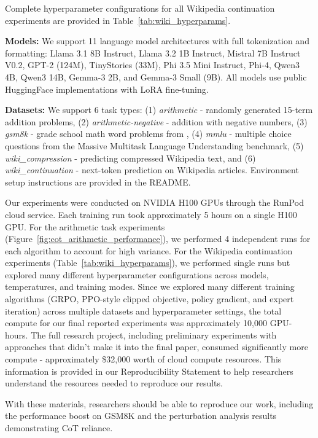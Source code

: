 \documentclass{article} %
\begin{document}
Complete hyperparameter configurations for all Wikipedia continuation experiments are provided in Table~\ref{tab:wiki_hyperparams}.

\textbf{Models:} We support 11 language model architectures with full tokenization and formatting: Llama 3.1 8B Instruct, Llama 3.2 1B Instruct, Mistral 7B Instruct V0.2, GPT-2 (124M), TinyStories (33M), Phi 3.5 Mini Instruct, Phi-4, Qwen3 4B, Qwen3 14B, Gemma-3 2B, and Gemma-3 Small (9B). All models use public HuggingFace implementations with LoRA fine-tuning.

\textbf{Datasets:} We support 6 task types: (1) \textit{arithmetic} - randomly generated 15-term addition problems, (2) \textit{arithmetic-negative} - addition with negative numbers, (3) \textit{gsm8k} - grade school math word problems from \citet{cobbe2021gsm8k}, (4) \textit{mmlu} - multiple choice questions from the Massive Multitask Language Understanding benchmark, (5) \textit{wiki\_compression} - predicting compressed Wikipedia text, and (6) \textit{wiki\_continuation} - next-token prediction on Wikipedia articles. Environment setup instructions are provided in the README. 

Our experiments were conducted on NVIDIA H100 GPUs through the RunPod cloud service. Each training run took approximately 5 hours on a single H100 GPU. For the arithmetic task experiments (Figure~\ref{fig:cot_arithmetic_performance}), we performed 4 independent runs for each algorithm to account for high variance. For the Wikipedia continuation experiments (Table~\ref{tab:wiki_hyperparams}), we performed single runs but explored many different hyperparameter configurations across models, temperatures, and training modes. Since we explored many different training algorithms (GRPO, PPO-style clipped objective, policy gradient, and expert iteration) across multiple datasets and hyperparameter settings, the total compute for our final reported experiments was approximately 10,000 GPU-hours. The full research project, including preliminary experiments with approaches that didn't make it into the final paper, consumed significantly more compute - approximately \$32,000 worth of cloud compute resources. This information is provided in our Reproducibility Statement to help researchers understand the resources needed to reproduce our results.

With these materials, researchers should be able to reproduce our work, including the performance boost on GSM8K and the perturbation analysis results demonstrating CoT reliance.
\end{document}
